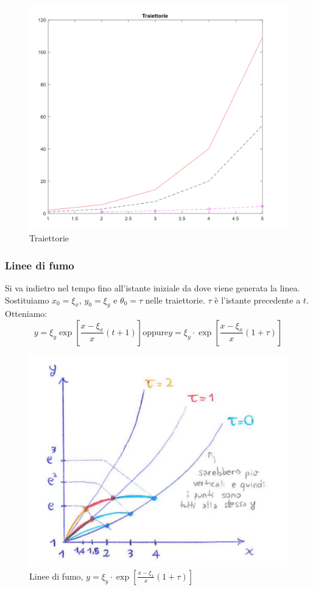 \documentclass[a4paper]{article}
\numberwithin{equation}{section}%
\begin{document}
\begin{figure}[H]
	\begin{center}
		\includegraphics[width=0.4\columnwidth]{traiettorie.png}
	\end{center}
	\caption{Traiettorie}
\end{figure}

\subsubsection{Linee di fumo}

Si va indietro nel tempo fino all'istante iniziale da dove viene generata la linea.
Sostituiamo $x_0=\xi_x$, $y_0=\xi_y$  e $\theta_0=\tau$ nelle traiettorie. $\tau$ è l'istante precedente a $t$. Otteniamo:
\begin{equation}
y=\xi_{y} \exp \left[\frac{x-\xi_{x}}{x}(t+1)\right] \text{oppure} y=\xi_{y} \cdot \exp \left[\frac{x-\xi_{x}}{x}(1+\tau)\right]
\end{equation}

\begin{figure}[H]
	\begin{center}
		\includegraphics[width=0.4\columnwidth]{lineedifumo.png}
	\end{center}
	\caption{Linee di fumo, $ y=\xi_{y} \cdot \exp \left[\frac{x-\xi_{x}}{x}(1+\tau)\right]$}
\end{figure}
\end{document}
